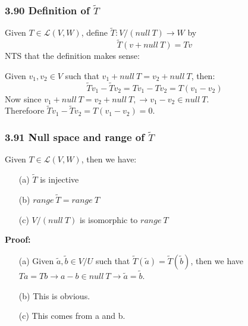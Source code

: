 \documentclass{article}
\begin{document}
\subsubsection*{3.90 Definition of $\tilde{T}$}
Given $T \in \mathcal{L}(V, W)$, define $\tilde{T}: V/(null\ T) \rightarrow W$ by
\begin{equation*}
    \tilde{T}(v + null\ T) = Tv
\end{equation*}
NTS that the definition makes sense:
\begin{addmargin}[1em]{0em}
    Given $v_1, v_2 \in V$ such that $v_1 + null\ T = v_2 + null\ T$, then:\\
    \begin{equation*}
        \tilde{T}v_1 - \tilde{T}v_2 = Tv_1 -Tv_2 = T(v_1 - v_2)
    \end{equation*}
    Now since $v_1 + null\ T = v_2 + null\ T, \rightarrow v_1 - v_2 \in null\ T$.\\
    Therefoore $\tilde{T}v_1 - \tilde{T}v_2 = T(v_1 - v_2) = 0$.
\end{addmargin}
\subsubsection*{3.91 Null space and range of $\tilde{T}$}
Given $T \in \mathcal{L}(V, W)$, then we have:
\begin{itemize}
    \item[(a)] $\tilde{T}$ is injective
    \item[(b)] $range\ \tilde{T} = range\ T$
    \item[(c)] $V/(null\ T)$ is isomorphic to $range\ T$
\end{itemize}
\textbf{Proof:}
\begin{addmargin}[1em]{0em}
    \begin{itemize}
        \item[(a)] Given $\tilde{a}, \tilde{b} \in V/U$ such that $\tilde{T}(\tilde{a}) = \tilde{T}(\tilde{b})$, then we have $Ta = Tb \rightarrow a-b \in null\ T \rightarrow \tilde{a} = \tilde{b}$.
        \item[(b)] This is obvious.
        \item[(c)] This comes from a and b.
    \end{itemize}
\end{addmargin}
\end{document}
